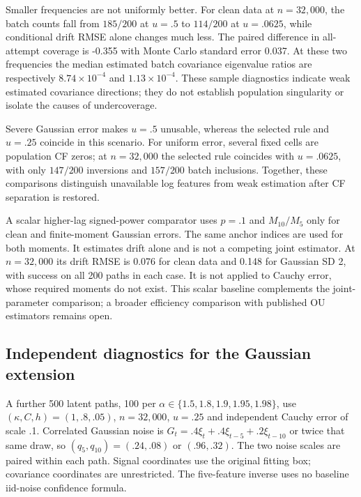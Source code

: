 \documentclass[11pt,a4paper]{article}
\theoremstyle{remark}\newtheorem{remark}[theorem]{Remark}
\begin{document}
Smaller frequencies are not uniformly better. For clean data at $n=32{,}000$, the batch counts fall from $185/200$ at $u=.5$ to $114/200$ at $u=.0625$, while conditional drift RMSE alone changes much less. The paired difference in all-attempt coverage is -0.355 with Monte Carlo standard error 0.037. At these two frequencies the median estimated batch covariance eigenvalue ratios are respectively $8.74\times10^{-4}$ and $1.13\times10^{-4}$. These sample diagnostics indicate weak estimated covariance directions; they do not establish population singularity or isolate the causes of undercoverage.

Severe Gaussian error makes $u=.5$ unusable, whereas the selected rule and $u=.25$ coincide in this scenario. For uniform error, several fixed cells are population CF zeros; at $n=32{,}000$ the selected rule coincides with $u=.0625$, with only $147/200$ inversions and $157/200$ batch inclusions. Together, these comparisons distinguish unavailable log features from weak estimation after CF separation is restored.

A scalar higher-lag signed-power comparator uses $p=.1$ and $M_{10}/M_5$ only for clean and finite-moment Gaussian errors. The same anchor indices are used for both moments. It estimates drift alone and is not a competing joint estimator. At $n=32{,}000$ its drift RMSE is 0.076 for clean data and 0.148 for Gaussian SD 2, with success on all 200 paths in each case. It is not applied to Cauchy error, whose required moments do not exist. This scalar baseline complements the joint-parameter comparison; a broader efficiency comparison with published OU estimators remains open.

\subsection{Independent diagnostics for the Gaussian extension}
A further 500 latent paths, 100 per $\alpha\in\{1.5,1.8,1.9,1.95,1.98\}$, use $(\kappa,C,h)=(1,.8,.05)$, $n=32{,}000$, $u=.25$ and independent Cauchy error of scale .1. Correlated Gaussian noise is $G_t=.4\xi_t+.4\xi_{t-5}+.2\xi_{t-10}$ or twice that same draw, so $(q_5,q_{10})=(.24,.08)$ or $(.96,.32)$. The two noise scales are paired within each path. Signal coordinates use the original fitting box; covariance coordinates are unrestricted. The five-feature inverse uses no baseline iid-noise confidence formula.
\end{document}
